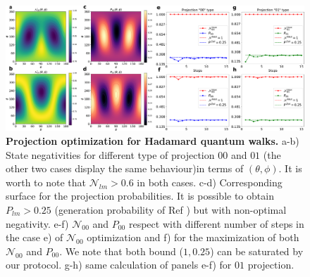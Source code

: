 \documentclass[
aps, pra, authorblock, superscriptaddress, twocolumn,
	10pt]{revtex4-1}
\begin{document}
\begin{figure}[t]
    \centering
    \includegraphics[width=\textwidth]{proj.pdf}
    \caption{\textbf{Projection optimization for Hadamard quantum walks.} a-b) State negativities for different type of projection $00$ and $01$ (the other two cases display the same behaviour)in terms of $(\theta, \phi)$. It is worth to note that $\mathcal{N}_{lm}>0.6$ in both cases. c-d) Corresponding surface for the projection probabilities. It is possible to obtain $P_{lm}> 0.25$ (generation probability of Ref \cite{fickler2012quantum}) but with non-optimal negativity. e-f) $\mathcal{N}_{00}$ and $P_{00}$ respect with different number of steps in the case e) of $\mathcal{N}_{00}$ optimization and f) for the maximization of both $\mathcal{N}_{00}$ and $P_{00}$. We note that both bound ($1, 0.25$) can be saturated by our protocol. g-h) same calculation of panels e-f) for $01$ projection.}
    \label{fig:10steps_results}
\end{figure}
\end{document}
